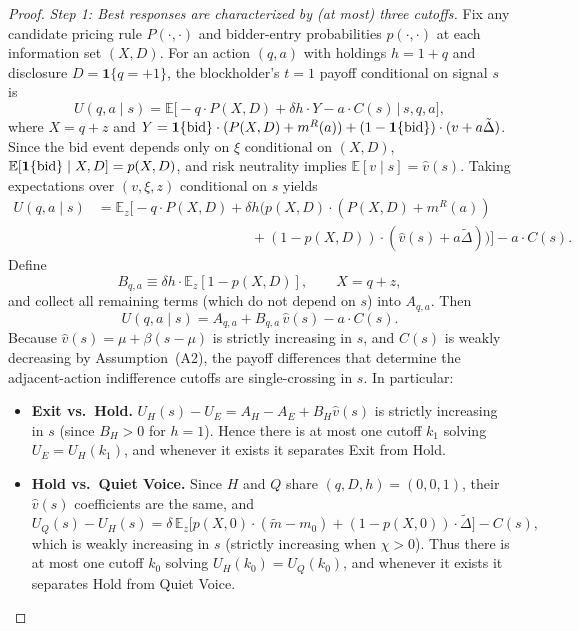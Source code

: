 \documentclass[11pt]{article}
\newcommand{\E}{\mathbb{E}}
\newcommand{\1}{\mathbf{1}}
\begin{document}
\begin{proof}
\textit{Step 1: Best responses are characterized by (at most) three cutoffs.}
Fix any candidate pricing rule $P(\cdot,\cdot)$ and bidder-entry probabilities $p(\cdot,\cdot)$ at each information set $(X,D)$. For an action $(q,a)$ with holdings $h=1+q$ and disclosure $D=\1\{q=+1\}$, the blockholder's $t=1$ payoff conditional on signal $s$ is
\[
U(q,a \mid s)
= \E\Big[-q\cdot P(X,D) + \delta h \cdot Y - a\cdot C(s) \,\Big|\, s,q,a\Big],
\]
where $X=q+z$ and $Y=\1\{\textup{bid}\}\cdot (P(X,D)+m^{R}(a)) + (1-\1\{\textup{bid}\})\cdot (v+a\tilde{\Delta})$.
Since the bid event depends only on $\xi$ conditional on $(X,D)$, $\E[\1\{\textup{bid}\} \mid X,D]=p(X,D)$, and risk neutrality implies $\E[v \mid s]=\hat v(s)$. Taking expectations over $(v,\xi,z)$ conditional on $s$ yields
\begin{align*}
U(q,a \mid s)
&= \E_z\Big[-q\cdot P(X,D) + \delta h \big(p(X,D)\cdot (P(X,D)+m^{R}(a)) \\
&\qquad\qquad\qquad\qquad\qquad\quad + (1-p(X,D))\cdot(\hat{v}(s)+a\tilde{\Delta})\big)\Big] - a\cdot C(s).
\end{align*}
Define
\[
B_{q,a}\equiv \delta h\cdot \E_z[1-p(X,D)],\qquad X=q+z,
\]
and collect all remaining terms (which do not depend on $s$) into $A_{q,a}$. Then
\begin{equation}
U(q,a \mid s)=A_{q,a}+B_{q,a}\,\hat{v}(s)-a\cdot C(s).
\label{eq:U-affine}
\end{equation}
Because $\hat v(s)=\mu+\beta(s-\mu)$ is strictly increasing in $s$, and $C(s)$ is weakly decreasing by Assumption~\textup{(A2)}, the payoff differences that determine the adjacent-action indifference cutoffs are single-crossing in $s$. In particular:
\begin{itemize}[leftmargin=1.5em,itemsep=2pt]
\item \textbf{Exit vs.\ Hold.} $U_H(s)-U_E=A_{H}-A_{E}+B_{H}\hat v(s)$ is strictly increasing in $s$ (since $B_H>0$ for $h=1$). Hence there is at most one cutoff $k_1$ solving $U_E=U_H(k_1)$, and whenever it exists it separates Exit from Hold.
\item \textbf{Hold vs.\ Quiet Voice.} Since $H$ and $Q$ share $(q,D,h)=(0,0,1)$, their $\hat v(s)$ coefficients are the same, and
\begin{equation}
U_Q(s)-U_H(s)=\delta\,\E_z\!\Big[p(X,0)\cdot(\tilde m-m_0)+(1-p(X,0))\cdot\tilde\Delta\Big]-C(s),
\label{eq:UH-UQ}
\end{equation}
which is weakly increasing in $s$ (strictly increasing when $\chi>0$). Thus there is at most one cutoff $k_0$ solving $U_H(k_0)=U_Q(k_0)$, and whenever it exists it separates Hold from Quiet Voice.

\end{itemize}
\end{proof}
\end{document}
